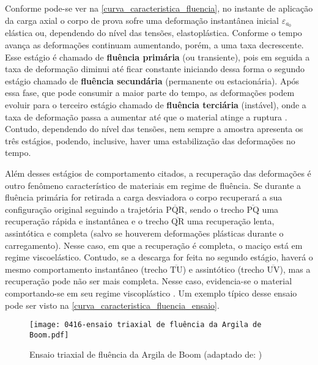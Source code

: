 Conforme pode-se ver na \autoref{curva_caracteristica_fluencia}, no instante de aplicação da carga axial o corpo de prova sofre uma deformação instantânea inicial $\varepsilon_{a_{0}}$ elástica ou, dependendo do nível das tensões, elastoplástica. Conforme o tempo avança as deformações continuam aumentando, porém, a uma taxa decrescente. Esse estágio é chamado de \textbf{fluência primária} (ou transiente), pois em seguida a taxa de deformação diminui até ficar constante iniciando dessa forma o segundo estágio chamado de \textbf{fluência secundária} (permanente ou estacionária). Após essa fase, que pode consumir a maior parte do tempo, as deformações podem evoluir para o terceiro estágio chamado de \textbf{fluência terciária} (instável), onde a taxa de deformação passa a aumentar até que o material atinge a ruptura \cite{Costa1984}. Contudo, dependendo do nível das tensões, nem sempre a amostra apresenta os três estágios, podendo, inclusive, haver uma estabilização das deformações no tempo.

Além desses estágios de comportamento citados, a recuperação das deformações é outro fenômeno característico de materiais em regime de fluência. Se durante a fluência primária for retirada a carga desviadora o corpo recuperará a sua configuração original seguindo a trajetória $\overline{\textrm{PQR}}$, sendo o trecho $\overline{\textrm{PQ}}$ uma recuperação rápida e instantânea e o trecho $\overline{\textrm{QR}}$ uma recuperação lenta, assintótica e completa (salvo se houverem deformações plásticas durante o carregamento). Nesse caso, em que a recuperação é completa, o maciço está em regime viscoelástico. Contudo, se a descarga for feita no segundo estágio, haverá o mesmo comportamento instantâneo (trecho $\overline{\textrm{TU}}$) e assintótico (trecho $\overline{\textrm{UV}}$), mas a recuperação pode não ser mais completa. Nesse caso, evidencia-se o material comportando-se em seu regime viscoplástico \cite{Costa1984}. Um exemplo típico desse ensaio pode ser visto na \autoref{curva_caracteristica_fluencia_ensaio}.

\begin{figure}[H]
	\begin{center}
		\texttt{[image: 0416-ensaio triaxial de fluência da Argila de Boom.pdf]}
	\end{center}
	\caption{\label{curva_caracteristica_fluencia_ensaio}Ensaio triaxial de fluência da Argila de Boom (adaptado de: )}
\end{figure}

